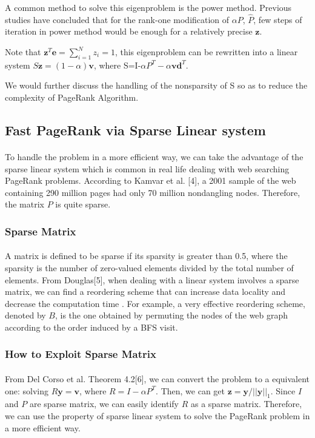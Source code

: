 \documentclass[a0,portrait]{a0poster}
\begin{document}
\begin{multicols}{2}
        A common method to solve this eigenproblem is the power method. Previous studies have concluded that for the rank-one modification of $\alpha P$, $\hat{P}$, few steps of iteration in power method would be enough for a relatively precise $\textbf{z}$.
        
        Note that $\textbf{z}^T\textbf{e}=\sum^N_{i=1}z_i=1$,
        this eigenproblem can be rewritten into a linear system
        $S\textbf{z}=(1-\alpha)\textbf{v}$,
        where S=I-$\alpha P^T-\alpha\textbf{vd}^T$.
        
        We would further discuss the handling of the nonsparsity of S so as to reduce the complexity of PageRank Algorithm.
\subsection*{Fast PageRank via Sparse Linear system}
\paragraph{}
To handle the problem in a more efficient way, we can take the advantage of the sparse linear system which is common in real life dealing with web searching PageRank problems.  According to Kamvar et al. [4], a 2001 sample of the web containing 290 million pages had only 70 million nondangling nodes. Therefore, the matrix $P$ is quite sparse.
\subsubsection*{Sparse Matrix}
\paragraph{}
A matrix is defined to be sparse if its sparsity is greater than 0.5, where the sparsity is the number of zero-valued elements divided by the total number of elements. From Douglas[5], when dealing with a  linear system involves a sparse matrix, we can find a reordering scheme that can increase data locality and decrease the computation time . For example, a very eﬀective reordering scheme, denoted by $B$, is the one obtained by permuting the nodes of the web graph according to the order induced by a BFS visit.

\subsubsection*{How to Exploit Sparse Matrix}
\paragraph{}
From Del Corso et al. Theorem 4.2[6], we can convert the problem to a equivalent one: solving $R\mathbf{y}=\mathbf{v}$, where $R=I-\alpha P^T$. Then, we can get $\mathbf{z} = \mathbf{y}/ ||\mathbf{y}||_1$. Since $I$ and $P$ are sparse matrix, we can easily identify $R$ as a sparse matrix. Therefore, we can use the property of sparse linear system to solve the PageRank problem in a more efficient way.


\end{multicols}
\end{document}
